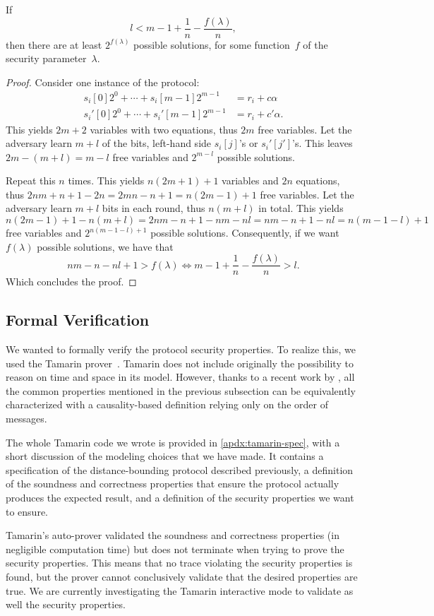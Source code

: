 \begin{theorem}
  If \[l < m-1+\frac{1}{n}-\frac{f(\lambda)}{n},\] then there are at least 
  \(2^{f(\lambda)}\) possible solutions, for some function~\(f\) of the 
  security parameter~\(\lambda\).
\end{theorem}
\begin{proof}
  Consider one instance of the protocol:
  \begin{align*}
    s_i[0]2^0 + \dotsb + s_i[m-1]2^{m-1} &= r_i + c\alpha \\
    s_i'[0]2^0 + \dotsb + s_i'[m-1]2^{m-1} &= r_i + c'\alpha.
  \end{align*}
  This yields \(2m+2\) variables with two equations, thus \(2m\) free variables.
  Let the adversary learn \(m+l\) of the bits, \ie left-hand side \(s_i[j]\)'s or 
  \(s_i'[j']\)'s.
  This leaves \(2m-(m+l) = m-l\) free variables and \(2^{m-l}\) possible 
  solutions.

  Repeat this \(n\) times.
  This yields \(n(2m+1)+1\) variables and \(2n\) equations, thus \(2nm+n+1-2n = 
  2mn - n +1 = n(2m-1)+1\) free variables.
  Let the adversary learn \(m+l\) bits in each round, thus \(n(m+l)\) in total.
  This yields \(n(2m-1)+1 -n(m+l) = 2nm-n+1-nm-nl = nm-n+1-nl = n(m-1-l)+1\) 
  free variables and \(2^{n(m-1-l)+1}\) possible solutions.
  Consequently, if we want \(f(\lambda)\) possible solutions, we have that
  \begin{equation*}
    nm-n-nl+1 > f(\lambda) \iff m-1+\frac{1}{n}-\frac{f(\lambda)}{n} > l.
  \end{equation*}
  Which concludes the proof.
\end{proof}

\subsection{Formal Verification}

We wanted to formally verify the protocol security properties. To realize this, 
we used the Tamarin prover~\cite{meier2013tamarin}. Tamarin does not include 
originally the possibility to reason on time and space in its model.
However, thanks to a recent work by \textcite{TamarinDB}, all the common 
properties mentioned in the previous subsection can be equivalently 
characterized with a causality-based definition relying only on the order of 
messages.

The whole Tamarin code we wrote is provided in \cref{apdx:tamarin-spec}, with a short discussion of the modeling choices that we have made. 
It contains a specification of the distance-bounding protocol described previously, a definition of the soundness and correctness properties that ensure the protocol actually produces the expected result, and a definition of the security properties we want to ensure.

Tamarin's auto-prover validated the soundness and correctness properties (in negligible computation time) but does not terminate when trying to prove the security properties.
This means that no trace violating the security properties is found, but the prover cannot conclusively validate that the desired properties are true. 
We are currently investigating the Tamarin interactive mode to validate as well the security properties.


